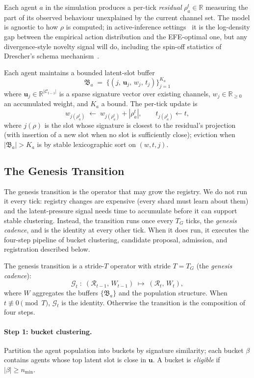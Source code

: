 \documentclass[journal,onecolumn,11pt]{IEEEtran}
\theoremstyle{definition}
\begin{document}
Each agent $a$ in the simulation produces a per-tick \emph{residual} $\rho_a^t \in \mathbb{R}$ measuring the part of its observed behaviour unexplained by the current channel set. The model is agnostic to how $\rho$ is computed; in active-inference settings~\cite{friston2010} it is the log-density gap between the empirical action distribution and the EFE-optimal one, but any divergence-style novelty signal will do, including the spin-off statistics of Drescher's schema mechanism~\cite{drescher1991}.

Each agent maintains a bounded latent-slot buffer
\[
\mathfrak{B}_a \;=\; \bigl\{(j,\, \mathbf{u}_j,\, w_j,\, t_j)\bigr\}_{j=1}^{K_a}
\]
where $\mathbf{u}_j \in \mathbb{R}^{|\mathcal{C}_{t-1}|}$ is a sparse signature vector over existing channels, $w_j \in \mathbb{R}_{\ge 0}$ an accumulated weight, and $K_a$ a bound. The per-tick update is
\[
w_{j(\rho_a^t)} \;\leftarrow\; w_{j(\rho_a^t)} + |\rho_a^t|, \qquad t_{j(\rho_a^t)} \leftarrow t,
\]
where $j(\rho)$ is the slot whose signature is closest to the residual's projection (with insertion of a new slot when no slot is sufficiently close); eviction when $|\mathfrak{B}_a| > K_a$ is by stable lexicographic sort on $(w, t, j)$.

\subsection{The Genesis Transition}
\label{sec:gtrans}

The genesis transition is the operator that may grow the registry. We do not run it every tick: registry changes are expensive (every shard must learn about them) and the latent-pressure signal needs time to accumulate before it can support stable clustering. Instead, the transition runs once every $T_G$ ticks, the \emph{genesis cadence}, and is the identity at every other tick. When it does run, it executes the four-step pipeline of bucket clustering, candidate proposal, admission, and registration described below.

The genesis transition is a stride-$T$ operator with stride $T = T_G$ (the \emph{genesis cadence}):
\[
\mathcal{G}_t \;:\; (\mathcal{R}_{t-1},\, W_{t-1}) \;\longmapsto\; (\mathcal{R}_t,\, W_t),
\]
where $W$ aggregates the buffers $\{\mathfrak{B}_a\}$ and the population structure. When $t \not\equiv 0 \pmod T$, $\mathcal{G}_t$ is the identity. Otherwise the transition is the composition of four steps.

\paragraph{Step 1: bucket clustering.} Partition the agent population into buckets by signature similarity; each bucket $\beta$ contains agents whose top latent slot is close in $\mathbf{u}$. A bucket is \emph{eligible} if $|\beta| \ge n_{\min}$.
\end{document}
